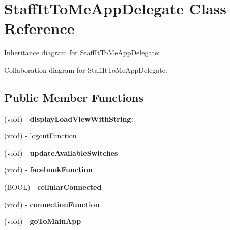 \hypertarget{interface_staff_it_to_me_app_delegate}{
\section{\-Staff\-It\-To\-Me\-App\-Delegate \-Class \-Reference}
\label{interface_staff_it_to_me_app_delegate}
}


\-Inheritance diagram for \-Staff\-It\-To\-Me\-App\-Delegate\-:


\-Collaboration diagram for \-Staff\-It\-To\-Me\-App\-Delegate\-:
\subsection*{\-Public \-Member \-Functions}
\begin{DoxyCompactItemize}
\item 
\hypertarget{interface_staff_it_to_me_app_delegate_a0201afd3356b96512b75e9ca8421c94b}{
(void) -\/ {\bfseries display\-Load\-View\-With\-String\-:}}
\label{interface_staff_it_to_me_app_delegate_a0201afd3356b96512b75e9ca8421c94b}

\item 
(void) -\/ \hyperlink{interface_staff_it_to_me_app_delegate_aa3d9d8fe59ec0655eb19ac1b596d5be1}{logout\-Function}
\item 
\hypertarget{interface_staff_it_to_me_app_delegate_ab6379bcaf9f454be38564e05faeba864}{
(void) -\/ {\bfseries update\-Available\-Switches}}
\label{interface_staff_it_to_me_app_delegate_ab6379bcaf9f454be38564e05faeba864}

\item 
\hypertarget{interface_staff_it_to_me_app_delegate_a0856eda14fe0f9d9b7ede3ea68cad259}{
(void) -\/ {\bfseries facebook\-Function}}
\label{interface_staff_it_to_me_app_delegate_a0856eda14fe0f9d9b7ede3ea68cad259}

\item 
\hypertarget{interface_staff_it_to_me_app_delegate_acf8ef7db277c825c37e01340f0253970}{
(\-B\-O\-O\-L) -\/ {\bfseries cellular\-Connected}}
\label{interface_staff_it_to_me_app_delegate_acf8ef7db277c825c37e01340f0253970}

\item 
\hypertarget{interface_staff_it_to_me_app_delegate_aa8c3680918bea93adaf6b29219ddc4ca}{
(void) -\/ {\bfseries connection\-Function}}
\label{interface_staff_it_to_me_app_delegate_aa8c3680918bea93adaf6b29219ddc4ca}

\item 
\hypertarget{interface_staff_it_to_me_app_delegate_ab66a353d89df3cbe3b73e3b9f14c9bf3}{
(void) -\/ {\bfseries go\-To\-Main\-App}}
\label{interface_staff_it_to_me_app_delegate_ab66a353d89df3cbe3b73e3b9f14c9bf3}


\end{DoxyCompactItemize}
